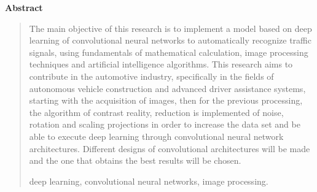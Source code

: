   \newpage
  \begin{center}
   {\bf\LARGE Abstract}\vskip 1.5cm
  \end{center} 
  \begin{quotation}

  The main objective of this research is to implement a model based on deep learning of convolutional neural networks to automatically recognize traffic signals, using fundamentals of mathematical calculation, image processing techniques and artificial intelligence algorithms.
  \vskip 0.2cm
  This research aims to contribute in the automotive industry, specifically in the fields of autonomous vehicle construction and advanced driver assistance systems, starting with the acquisition of images, then for the previous processing, the algorithm of contrast reality, reduction is implemented of noise, rotation and scaling projections in order to increase the data set and be able to execute deep learning through convolutional neural network architectures. Different designs of convolutional architectures will be made and the one that obtains the best results will be chosen.

  \vskip 0.3cm
  \hspace*{-0.6cm}{\bf Keywords:} deep learning, convolutional neural networks, image processing.
  \end {quotation}



